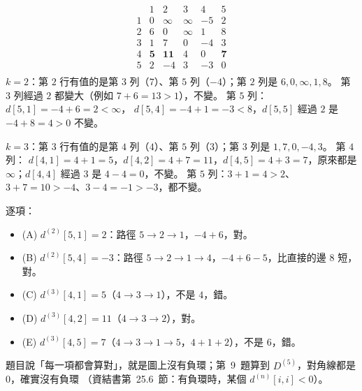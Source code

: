 \begin{pastsoln}
\[\begin{array}{c|rrrrr}
 & 1 & 2 & 3 & 4 & 5 \\ \hline
1 & 0 & \infty & \infty & -5 & 2 \\
2 & 6 & 0 & \infty & 1 & 8 \\
3 & 1 & 7 & 0 & -4 & 3 \\
4 & \mathbf{5} & \mathbf{11} & 4 & 0 & \mathbf{7} \\
5 & 2 & -4 & 3 & -3 & 0 \\
\end{array}
\]
\textbf{$k = 2$}：第 $2$ 行有值的是第 $3$ 列（$7$）、第 $5$ 列（$-4$）；第 $2$ 列是 $6, 0, \infty, 1, 8$。
第 $3$ 列經過 $2$ 都變大（例如 $7 + 6 = 13 > 1$），不變。 第 $5$ 列：$d[5,1] = -4 + 6 = 2 < \infty$，
$d[5,4] = -4 + 1 = -3 < 8$，$d[5,5]$ 經過 $2$ 是 $-4 + 8 = 4 > 0$ 不變。

\textbf{$k = 3$}：第 $3$ 行有值的是第 $4$ 列（$4$）、第 $5$ 列（$3$）；第 $3$ 列是 $1, 7, 0, -4, 3$。 第 $4$ 列：
$d[4,1] = 4 + 1 = 5$，$d[4,2] = 4 + 7 = 11$，$d[4,5] = 4 + 3 = 7$，原來都是 $\infty$；$d[4,4]$ 經過 $3$ 是
$4 - 4 = 0$，不變。 第 $5$ 列：$3 + 1 = 4 > 2$、$3 + 7 = 10 > -4$、$3 - 4 = -1 > -3$，都不變。

逐項：
\begin{itemize}
\item (A) $d^{(2)}[5,1] = 2$：路徑 $5 \to 2 \to 1$，$-4 + 6$，對。
\item (B) $d^{(2)}[5,4] = -3$：路徑 $5 \to 2 \to 1 \to 4$，$-4 + 6 - 5$，比直接的邊 $8$ 短，對。
\item (C) $d^{(3)}[4,1] = 5$（$4 \to 3 \to 1$），不是 $4$，錯。
\item (D) $d^{(3)}[4,2] = 11$（$4 \to 3 \to 2$），對。
\item (E) $d^{(3)}[4,5] = 7$（$4 \to 3 \to 1 \to 5$，$4 + 1 + 2$），不是 $6$，錯。
\end{itemize}
題目說「每一項都會算對」，就是圖上沒有負環；第~9~題算到 $D^{(5)}$，對角線都是 $0$，確實沒有負環
（資結書第~25.6~節：有負環時，某個 $d^{(n)}[i, i] < 0$）。
\end{pastsoln}
